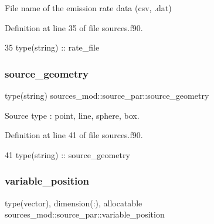 File name of the emission rate data (csv, .dat) 



Definition at line 35 of file sources.\+f90.


\begin{DoxyCode}
35         \textcolor{keywordtype}{type}(string) :: rate\_file
\end{DoxyCode}
\mbox{\label{structsources__mod_1_1source__par_a66e7627f128290f25c2c9eb36808eb5b}} 
\subsubsection{\texorpdfstring{source\+\_\+geometry}{source\_geometry}}
{\footnotesize\ttfamily type(string) sources\+\_\+mod\+::source\+\_\+par\+::source\+\_\+geometry\hspace{0.3cm}{\ttfamily [private]}}



Source type \+: \textquotesingle{}point\textquotesingle{}, \textquotesingle{}line\textquotesingle{}, \textquotesingle{}sphere\textquotesingle{}, \textquotesingle{}box\textquotesingle{}. 



Definition at line 41 of file sources.\+f90.


\begin{DoxyCode}
41         \textcolor{keywordtype}{type}(string) :: source\_geometry
\end{DoxyCode}
\mbox{\label{structsources__mod_1_1source__par_afbcc10e0797e65097faa6705050481dd}} 
\subsubsection{\texorpdfstring{variable\+\_\+position}{variable\_position}}
{\footnotesize\ttfamily type(vector), dimension(\+:), allocatable sources\+\_\+mod\+::source\+\_\+par\+::variable\+\_\+position\hspace{0.3cm}{\ttfamily [private]}}



